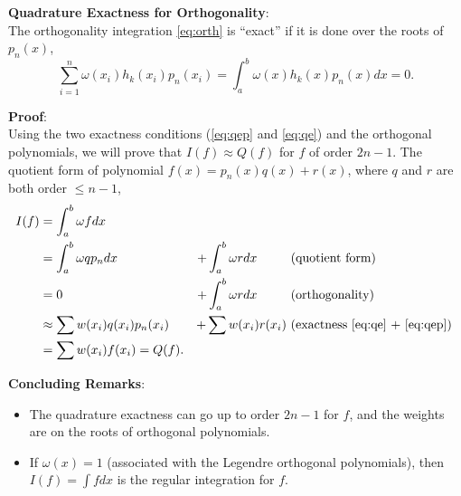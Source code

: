{\noindent \bf Quadrature Exactness for Orthogonality}: \\
The orthogonality integration \eqref{eq:orth} is ``exact'' if it is done over the roots of $p_n(x)$, 
\begin{equation} \label{eq:qe}
  \sum_{i=1}^n \omega(x_i) h_k(x_i)p_n(x_i) = \int_a^b \omega(x) h_k(x) p_n(x)dx = 0.
\end{equation}

{\noindent \bf Proof}: \\
Using the two exactness conditions (\eqref{eq:qep} and \eqref{eq:qe}) and the orthogonal polynomials, we will prove that $I(f) \approx
Q(f)$ for $f$ of order $2n-1$. 
The quotient form of polynomial $f(x) = p_n(x)q(x) + r(x)$, where $q$ and $r$ are both order $\le n-1$,
\begin{equation}
   \begin{aligned}
   I(f) & =  \int_a^b \omega f dx & &  \\
   & = \int_a^b \omega q p_n dx & + \int_a^b \omega r dx \ \ \ \ \ \ \ & \text{ (quotient form) } \\
   & = 0 & + \int_a^b \omega r dx \ \ \ \ \ \ \ & \text{ (orthogonality) }\\
   & \approx \sum w(x_i) q(x_i) p_n(x_i) & + \sum w(x_i) r(x_i) & \text{ (exactness \eqref{eq:qe} + \eqref{eq:qep}) } \\
   & = \sum w(x_i) f(x_i) = Q(f). \\
   \end{aligned}
\end{equation}

{\noindent \bf Concluding Remarks}: \\
\begin{itemize}
  \item The quadrature exactness can go up to order $2n-1$ for $f$, and the weights are on the roots of
    orthogonal polynomials. \\
  \item If $\omega(x)=1$ (associated with the Legendre orthogonal polynomials), then $I(f)=\int f dx$ is the regular integration for $f$.
\end{itemize}
